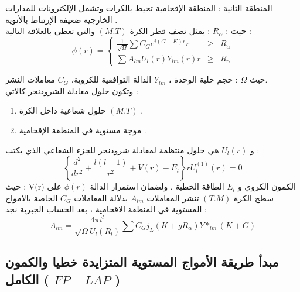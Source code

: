 المنطقة الثانية : المنطقة الإقحامية تحيط بالكرات وتشمل الإلكترونات للمدارات الخارجية ضعيفة الإرتباط  بالأنوية .\\
حيث :
$ R_{\alpha} $ : 	يمثل نصف قطر الكرة $ (M.T) $ والتي تعطى بالعلاقة التالية :		
\begin{equation}\label{}
	\phi (r) = \left\{\begin{array}{rcl}
		\frac{1}{\sqrt{\Omega}} \sum C_{G} e^{i(G+K)r}r & \geqslant & R_{\alpha} \\
		\sum A_{lm} U_{l} (r) Y_{lm}(r) r & \geqslant & R_{\alpha}
	\end{array} \right.
\end{equation}

حيث $ \Omega $ : حجم خلية الوحدة ، $ Y_{lm} $ الدالة التوافقية للكروية، $ C_{G} $ معاملات النشر.\\
وتكون حلول معادلة الشرودنجر كالاتي :
\begin{enumerate}
	\item  
	حلول شعاعية داخل الكرة $ (M.T)  $ . 
	\item 
	موجة مستوية في المنطقة الإقحامية .
\end{enumerate}
و  $ U_{l} (r) $ هي حلول منتظمة لمعادلة شرودنجر للجزء الشعاعي الذي يكتب  :		
\begin{equation}\label{}
	\left\{\frac{d^{2}}{dr^{2}} + \dfrac{l(l+1)}{r^{2}} + V(r) - E_{l} \right\} r U_{l}^{(1)} (r) = 0 
\end{equation}
حيث : V(r) الكمون الكروي و $  E_{l} $  الطاقة الخطية .
ولضمان استمرار الدالة $ \phi (r) $ على سطح الكرة $ (T.M) $ تنشر المعاملات $ A_{lm} $ بدلالة المعاملات $ C_{G} $ الخاصة بالامواج المستوية في  المنطقة الاقحامية ، بعد الحساب الجبرية نجد :
\begin{equation}\label{}
	A_{lm} = \dfrac{4\pi i^{l}}{\sqrt{\Omega} U_{l} (R_{l})} \sum C_{G} j_{L} ( K + g  R_{\alpha}) Y*_{lm} (K+G)
\end{equation}


\subsection{ مبدأ طريقة الأمواج المستوية المتزايدة خطيا والكمون الكامل ( $ FP-LAP $ ) }

